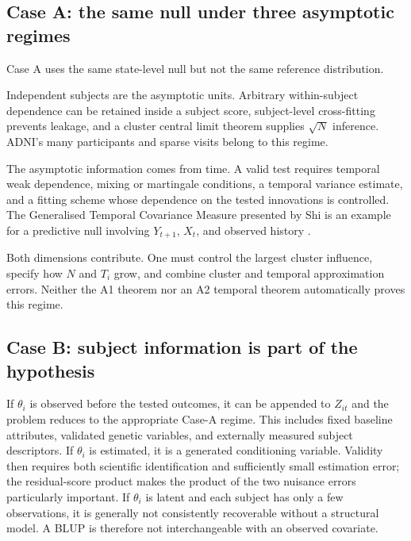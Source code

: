 \documentclass[11pt]{article}
\theoremstyle{definition}
\begin{document}
\subsection{Case A: the same null under three asymptotic regimes}

Case A uses the same state-level null but not the same reference distribution.
\begin{description}[leftmargin=2.7cm,style=nextline]
\item[A1: $N\to\infty$, bounded or controlled $T_i$.]
Independent subjects are the asymptotic units. Arbitrary within-subject dependence can be
retained inside a subject score, subject-level cross-fitting prevents leakage, and a cluster
central limit theorem supplies $\sqrt N$ inference. ADNI's many participants and sparse visits
belong to this regime.
\item[A2: fixed or small $N$, $T\to\infty$.]
The asymptotic information comes from time. A valid test requires temporal weak dependence,
mixing or martingale conditions, a temporal variance estimate, and a fitting scheme whose
dependence on the tested innovations is controlled. The Generalised Temporal Covariance
Measure presented by Shi is an example for a predictive null involving $Y_{t+1}$, $X_t$, and
observed history \cite{shi2025}.
\item[A3: $N\to\infty$ and $T_i\to\infty$.]
Both dimensions contribute. One must control the largest cluster influence, specify how
$N$ and $T_i$ grow, and combine cluster and temporal approximation errors. Neither the A1
theorem nor an A2 temporal theorem automatically proves this regime.
\end{description}

\subsection{Case B: subject information is part of the hypothesis}

If $\theta_i$ is observed before the tested outcomes, it can be appended to $Z_{it}$ and the
problem reduces to the appropriate Case-A regime. This includes fixed baseline attributes,
validated genetic variables, and externally measured subject descriptors. If $\theta_i$ is
estimated, it is a generated conditioning variable. Validity then requires both scientific
identification and sufficiently small estimation error; the residual-score product makes the
product of the two nuisance errors particularly important. If $\theta_i$ is latent and each
subject has only a few observations, it is generally not consistently recoverable without a
structural model. A BLUP is therefore not interchangeable with an observed covariate.
\end{document}
